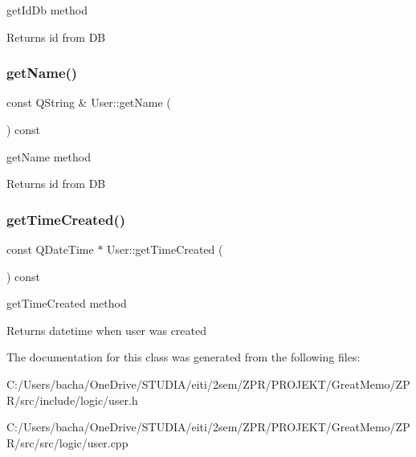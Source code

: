 get\+Id\+Db method 

\begin{DoxyReturn}{Returns}
id from DB 
\end{DoxyReturn}
\mbox{\label{class_user_a17b1075380f7b40f82f0efd6cb594f3c}} 
\subsubsection{\texorpdfstring{get\+Name()}{getName()}}
{\footnotesize\ttfamily const Q\+String \& User\+::get\+Name (\begin{DoxyParamCaption}{ }\end{DoxyParamCaption}) const}



get\+Name method 

\begin{DoxyReturn}{Returns}
id from DB 
\end{DoxyReturn}
\mbox{\label{class_user_ab195cb4d9a411de08a02bb4ddd336e1f}} 
\subsubsection{\texorpdfstring{get\+Time\+Created()}{getTimeCreated()}}
{\footnotesize\ttfamily const Q\+Date\+Time $\ast$ User\+::get\+Time\+Created (\begin{DoxyParamCaption}{ }\end{DoxyParamCaption}) const}



get\+Time\+Created method 

\begin{DoxyReturn}{Returns}
datetime when user was created 
\end{DoxyReturn}


The documentation for this class was generated from the following files\+:\begin{DoxyCompactItemize}
\item 
C\+:/\+Users/bacha/\+One\+Drive/\+S\+T\+U\+D\+I\+A/eiti/2sem/\+Z\+P\+R/\+P\+R\+O\+J\+E\+K\+T/\+Great\+Memo/\+Z\+P\+R/src/include/logic/user.\+h\item 
C\+:/\+Users/bacha/\+One\+Drive/\+S\+T\+U\+D\+I\+A/eiti/2sem/\+Z\+P\+R/\+P\+R\+O\+J\+E\+K\+T/\+Great\+Memo/\+Z\+P\+R/src/src/logic/user.\+cpp\end{DoxyCompactItemize}

